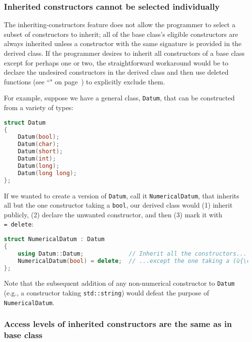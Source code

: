 \subsubsection[Inherited constructors cannot be selected individually]{Inherited constructors cannot be selected individually}\label{inherited-constructors-cannot-be-selected-individually}

The inheriting-constructors feature does not allow the programmer
to select a subset of constructors to inherit; all of the base
class's eligible constructors are always inherited unless a constructor
with the same signature is provided in the derived class. If the
programmer desires to inherit all constructors of a base class except
for perhaps one or two, the straightforward workaround would be to
declare the undesired constructors in the derived class and then use
deleted functions (see ``" on page~\pageref{deleted-functions}) to explicitly exclude them.

For example, suppose we have a general class, \texttt{Datum}, that can
be constructed from a variety of types:

\begin{lstlisting}[language=C++]
struct Datum
{
    Datum(bool);
    Datum(char);
    Datum(short);
    Datum(int);
    Datum(long);
    Datum(long long);
};
\end{lstlisting}

\noindent If we wanted to create a version of \texttt{Datum}, call it
\texttt{NumericalDatum}, that inherits all but the one constructor
taking a \texttt{bool}, our derived class would (1) inherit publicly,
(2) declare the unwanted constructor, and then (3) mark it with
\texttt{=}~\texttt{delete}:

\begin{lstlisting}[language=C++]
struct NumericalDatum : Datum
{
    using Datum::Datum;             // Inherit all the constructors...
    NumericalDatum(bool) = delete;  // ...except the one taking a (ù{\codeincomments{bool}}ù).
};
\end{lstlisting}

\noindent Note that the subsequent addition of any non-numerical constructor to
\texttt{Datum} (e.g., a constructor taking \texttt{std::string}) would
defeat the purpose of \texttt{NumericalDatum}.

\subsubsection[Access levels of inherited constructors are the same as in base class]{Access levels of inherited constructors are the same as in base class}\label{access-levels-of-inherited-constructors-are-same-as-in-base-class}

